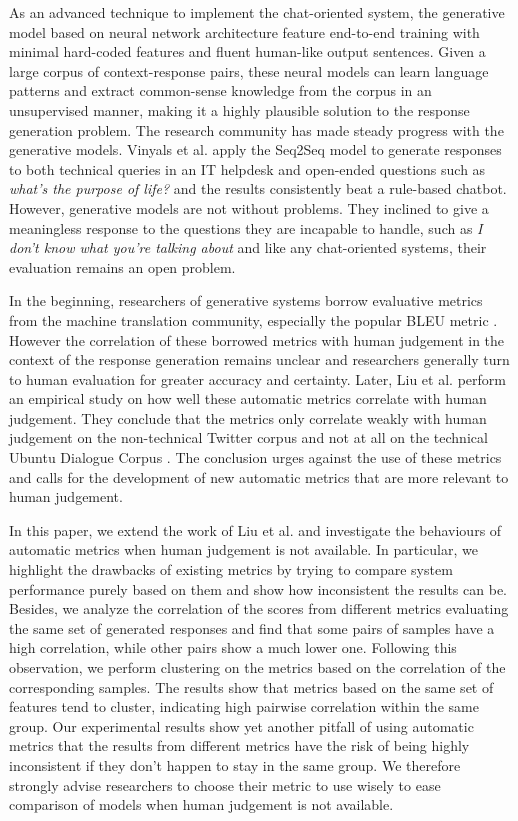\documentclass[runningheads]{llncs}
\begin{document}
    As an advanced technique to implement the chat-oriented system, the generative model based on neural network architecture feature end-to-end training with minimal hard-coded features and fluent human-like output sentences. Given a large corpus of context-response pairs, these neural models can learn language patterns and extract common-sense knowledge from the corpus in an unsupervised manner, making it a highly plausible solution to the response generation problem. The research community has made steady progress with the generative models. Vinyals et al. \cite{GoogleChatbot} apply the Seq2Seq model to generate responses to both technical queries in an IT helpdesk and open-ended questions such as \textit{what's the purpose of life?} and the results consistently beat a rule-based chatbot. However, generative models are not without problems. They inclined to give a meaningless response to the questions they are incapable to handle, such as \textit{I don't know what you're talking about} and like any chat-oriented systems, their evaluation remains an open problem.

    In the beginning, researchers of generative systems borrow evaluative metrics from the machine translation community, especially the popular BLEU metric \cite{BLEU}. However the correlation of these borrowed metrics with human judgement in the context of the response generation remains unclear and researchers generally turn to human evaluation for greater accuracy and certainty\cite{Shang, DCGM, VHRED}. Later, Liu et al. \cite{HowNot} perform an empirical study on how well these automatic metrics correlate with human judgement. They conclude that the metrics only correlate weakly with human judgement on the non-technical Twitter corpus and not at all on the technical Ubuntu Dialogue Corpus \cite{ubuntu_corpus}. The conclusion urges against the use of these metrics and calls for the development of new automatic metrics that are more relevant to human judgement.

    In this paper, we extend the work of Liu et al. and investigate the behaviours of automatic metrics when human judgement is not available. In particular, we highlight the drawbacks of existing metrics by trying to compare system performance purely based on them and show how inconsistent the results can be. Besides, we analyze the correlation of the scores from different metrics evaluating the same set of generated responses and find that some pairs of samples have a high correlation, while other pairs show a much lower one. Following this observation, we perform clustering on the metrics based on the correlation of the corresponding samples. The results show that metrics based on the same set of features tend to cluster, indicating high pairwise correlation within the same group. Our experimental results show yet another pitfall of using automatic metrics that the results from different metrics have the risk of being highly inconsistent if they don't happen to stay in the same group. We therefore strongly advise researchers to choose their metric to use wisely to ease comparison of models when human judgement is not available.
\end{document}
